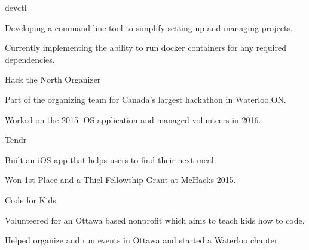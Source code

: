 

\begin{cventries}

  \cvprojectentry
    {devctl} %
    {
      \begin{cvitems} %
        \item {Developing a command line tool to simplify setting up and managing projects.}
        \item {Currently implementing the ability to run docker containers for any required dependencies.}
      \end{cvitems}
    }

  \cvprojectentry
	{Hack the North Organizer}    
    {
      \begin{cvitems} %
        \item {Part of the organizing team for Canada's largest hackathon in Waterloo,ON.}
        \item {Worked on the 2015 iOS application and managed volunteers in 2016.}
      \end{cvitems}
    }

  \cvprojectentry
    {Tendr} %
    {
      \begin{cvitems} %
        \item {Built an iOS app that helps users to find their next meal.}
        \item {Won 1st Place and a Thiel Fellowship Grant at McHacks 2015.}
      \end{cvitems}
    }

  \cvprojectentry
    {Code for Kids} %
    {
      \begin{cvitems} %
        \item {Volunteered for an Ottawa based nonprofit which aims to teach kids how to code.}
        \item {Helped organize and run events in Ottawa and started a Waterloo chapter.}
      \end{cvitems}
    }
  

\end{cventries}
